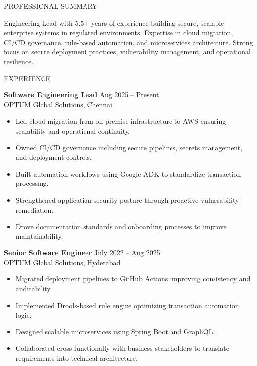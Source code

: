 \documentclass{resume}
\begin{document}
\begin{rSection}{PROFESSIONAL SUMMARY}

Engineering Lead with 5.5+ years of experience building secure, scalable enterprise systems in regulated environments. Expertise in cloud migration, CI/CD governance, rule-based automation, and microservices architecture. Strong focus on secure deployment practices, vulnerability management, and operational resilience.

\end{rSection}

\begin{rSection}{EXPERIENCE}

\textbf{Software Engineering Lead} \hfill Aug 2025 – Present \\
OPTUM Global Solutions, Chennai
\begin{itemize}
\itemsep -3pt {}
\item Led cloud migration from on-premise infrastructure to AWS ensuring scalability and operational continuity.
\item Owned CI/CD governance including secure pipelines, secrets management, and deployment controls.
\item Built automation workflows using Google ADK to standardize transaction processing.
\item Strengthened application security posture through proactive vulnerability remediation.
\item Drove documentation standards and onboarding processes to improve maintainability.
\end{itemize}

\textbf{Senior Software Engineer} \hfill July 2022 – Aug 2025 \\
OPTUM Global Solutions, Hyderabad
\begin{itemize}
\itemsep -3pt {}
\item Migrated deployment pipelines to GitHub Actions improving consistency and auditability.
\item Implemented Drools-based rule engine optimizing transaction automation logic.
\item Designed scalable microservices using Spring Boot and GraphQL.
\item Collaborated cross-functionally with business stakeholders to translate requirements into technical architecture.
\end{itemize}


\end{rSection}
\end{document}
